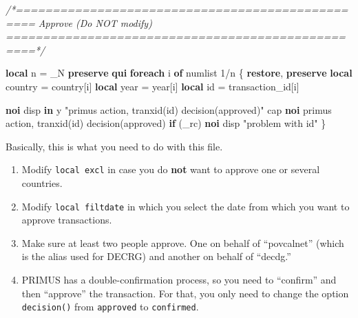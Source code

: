\documentclass[
]{book}
\newenvironment{Shaded}{\begin{snugshade}}{\end{snugshade}}
\newcommand{\CommentTok}[1]{\textcolor[rgb]{0.56,0.35,0.01}{\textit{#1}}}
\newcommand{\DataTypeTok}[1]{\textcolor[rgb]{0.13,0.29,0.53}{#1}}
\newcommand{\FunctionTok}[1]{\textcolor[rgb]{0.00,0.00,0.00}{#1}}
\newcommand{\KeywordTok}[1]{\textcolor[rgb]{0.13,0.29,0.53}{\textbf{#1}}}
\newcommand{\NormalTok}[1]{#1}
\newcommand{\OtherTok}[1]{\textcolor[rgb]{0.56,0.35,0.01}{#1}}
\newcommand{\StringTok}[1]{\textcolor[rgb]{0.31,0.60,0.02}{#1}}
\providecommand{\tightlist}{%
  \setlength{\itemsep}{0pt}\setlength{\parskip}{0pt}}
\begin{document}
\begin{Shaded}
\begin{Highlighting}[]
\CommentTok{/*=================================================}
\CommentTok{Approve (Do NOT modify)}
\CommentTok{==================================================*/}

\KeywordTok{local}\NormalTok{ n = \_N}
\KeywordTok{preserve} 
\KeywordTok{qui} \KeywordTok{foreach}\NormalTok{ i }\KeywordTok{of}\NormalTok{ numlist 1/}\OtherTok{\textasciigrave{}n\textquotesingle{}}\NormalTok{ \{}
  \KeywordTok{restore}\NormalTok{, }\KeywordTok{preserve}
  \KeywordTok{local}\NormalTok{ country = country[}\OtherTok{\textasciigrave{}i\textquotesingle{}}\NormalTok{]}
  \KeywordTok{local} \FunctionTok{year}\NormalTok{    = }\FunctionTok{year}\NormalTok{[}\OtherTok{\textasciigrave{}i\textquotesingle{}}\NormalTok{]}
  \KeywordTok{local}\NormalTok{ id      = transaction\_id[}\OtherTok{\textasciigrave{}i\textquotesingle{}}\NormalTok{]}
  
  \KeywordTok{noi}\NormalTok{ disp }\KeywordTok{in} \FunctionTok{y} \StringTok{"primus action, tranxid(\textasciigrave{}id\textquotesingle{}) decision(approved)"}
\NormalTok{  cap }\KeywordTok{noi}\NormalTok{ primus action, tranxid(}\OtherTok{\textasciigrave{}id\textquotesingle{}}\NormalTok{) decision(approved)}
  \KeywordTok{if}\NormalTok{ (}\DataTypeTok{\_rc}\NormalTok{) }\KeywordTok{noi}\NormalTok{ disp }\StringTok{"problem with \textasciigrave{}id\textquotesingle{}"}
\NormalTok{\}}
\end{Highlighting}
\end{Shaded}

Basically, this is what you need to do with this file.

\begin{enumerate}
\def\labelenumi{\arabic{enumi}.}
\tightlist
\item
  Modify \texttt{local\ excl} in case you do \textbf{not} want to approve one or several
  countries.
\item
  Modify \texttt{local\ filtdate} in which you select the date from which you want to
  approve transactions.
\item
  Make sure at least two people approve. One on behalf of ``povcalnet'' (which
  is the alias used for DECRG) and another on behalf of ``decdg.''
\item
  PRIMUS has a double-confirmation process, so you need to ``confirm'' and then
  ``approve'' the transaction. For that, you only need to change the option
  \texttt{decision()} from \texttt{approved} to \texttt{confirmed}.
\end{enumerate}
\end{document}
